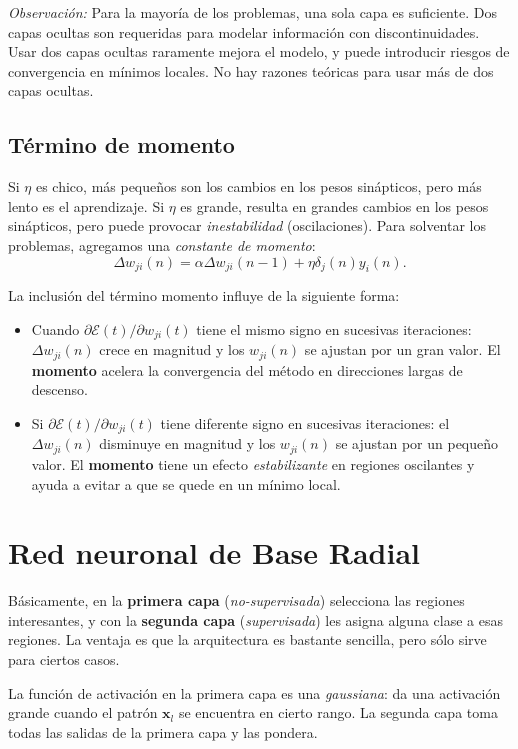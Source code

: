 \documentclass[10pt,a4paper]{article}
\begin{document}
\textit{Observación:} Para la mayoría de los problemas, una sola capa es suficiente. Dos capas ocultas son requeridas para modelar información con discontinuidades. Usar dos capas ocultas raramente mejora el modelo, y puede introducir riesgos de convergencia en mínimos locales. No hay razones teóricas para usar más de dos capas ocultas.

\subsection{Término de momento}
Si $\eta$ es chico, más pequeños son los cambios en los pesos sinápticos, pero más lento es el aprendizaje. Si $\eta$ es grande, resulta en grandes cambios en los pesos sinápticos, pero puede provocar \textit{inestabilidad} (oscilaciones). Para solventar los problemas, agregamos una \textit{constante de momento}:
\[\Delta w_{ji}(n)=\alpha \Delta w_{ji}(n-1)+\eta \delta_j(n)y_i(n).\]

La inclusión del término momento influye de la siguiente forma:
\begin{itemize}
\item Cuando $\partial \mathcal{E} (t) / \partial w_{ji}(t)$ tiene el mismo signo en sucesivas iteraciones: $\Delta w_{ji}(n)$ crece en magnitud y los $w_{ji}(n)$ se ajustan por un gran valor. El \textbf{momento} acelera la convergencia del método en direcciones largas de descenso.
\item Si $\partial \mathcal{E} (t) / \partial w_{ji}(t)$ tiene diferente signo en sucesivas iteraciones: el $\Delta w_{ji}(n)$ disminuye en magnitud y los $w_{ji}(n)$ se ajustan por un pequeño valor. El \textbf{momento} tiene un efecto \textit{estabilizante} en regiones oscilantes y ayuda a evitar a que se quede en un mínimo local.
\end{itemize}

\section{Red neuronal de Base Radial}

Básicamente, en la \textbf{primera capa} (\textit{no-supervisada}) selecciona las regiones interesantes, y con la \textbf{segunda capa} (\textit{supervisada}) les asigna alguna clase a esas regiones. La ventaja es que la arquitectura es bastante sencilla, pero sólo sirve para ciertos casos.

La función de activación en la primera capa es una \textit{gaussiana}: da una activación grande cuando el patrón $\mathbf{x}_l$ se encuentra en cierto rango. La segunda capa toma todas las salidas de la primera capa y las pondera.
\end{document}

